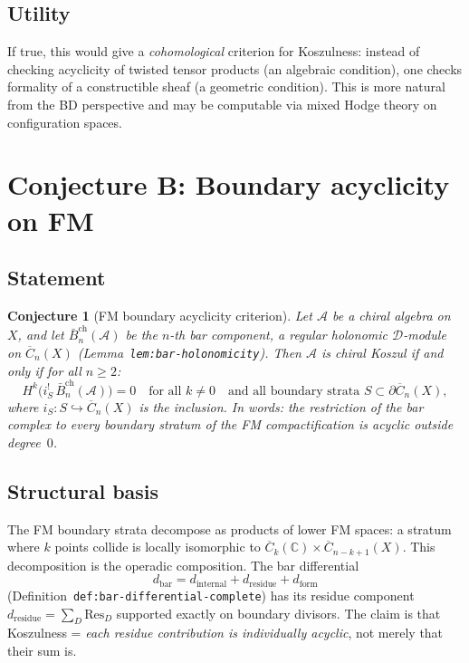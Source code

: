 \documentclass[11pt]{article}
\newcommand{\cA}{\mathcal{A}}
\newcommand{\cD}{\mathcal{D}}
\newcommand{\bC}{\mathbb{C}}
\newcommand{\barB}{\bar{B}}
\theoremstyle{plain}
\newtheorem{conjecture}{Conjecture}[section]
\theoremstyle{definition}
\theoremstyle{remark}
\begin{document}
\subsection{Utility}

If true, this would give a \emph{cohomological} criterion for
Koszulness: instead of checking acyclicity of twisted tensor
products (an algebraic condition), one checks formality of a
constructible sheaf (a geometric condition).  This is more natural
from the BD perspective and may be computable via mixed Hodge theory
on configuration spaces.


\section{Conjecture B: Boundary acyclicity on FM}
\label{sec:fm-boundary}

\subsection{Statement}

\begin{conjecture}[FM boundary acyclicity criterion]
\label{conj:fm-boundary}
Let $\cA$ be a chiral algebra on $X$, and let
$\barB_n^{\mathrm{ch}}(\cA)$ be the $n$-th bar component, a
regular holonomic $\cD$-module on $\overline{C}_n(X)$
(Lemma~\texttt{lem:bar-holonomicity}).  Then $\cA$ is chiral
Koszul if and only if for all $n \geq 2$:
\[
H^k\bigl(i_S^!\, \barB_n^{\mathrm{ch}}(\cA)\bigr) = 0
\quad\text{for all } k \neq 0
\quad\text{and all boundary strata } S \subset \partial\overline{C}_n(X),
\]
where $i_S \colon S \hookrightarrow \overline{C}_n(X)$ is the
inclusion.  In words: the restriction of the bar complex to every
boundary stratum of the FM compactification is acyclic outside
degree~$0$.
\end{conjecture}

\subsection{Structural basis}

The FM boundary strata decompose as products of lower FM spaces:
a stratum where $k$ points collide is locally isomorphic to
$\overline{C}_k(\bC) \times \overline{C}_{n-k+1}(X)$.  This
decomposition is the operadic composition.  The bar differential
\[
d_{\mathrm{bar}} = d_{\mathrm{internal}} + d_{\mathrm{residue}}
  + d_{\mathrm{form}}
\]
(Definition~\texttt{def:bar-differential-complete}) has its
residue component $d_{\mathrm{residue}} = \sum_D \mathrm{Res}_D$
supported exactly on boundary divisors.  The claim is that
Koszulness = \emph{each residue contribution is individually
acyclic}, not merely that their sum is.
\end{document}

